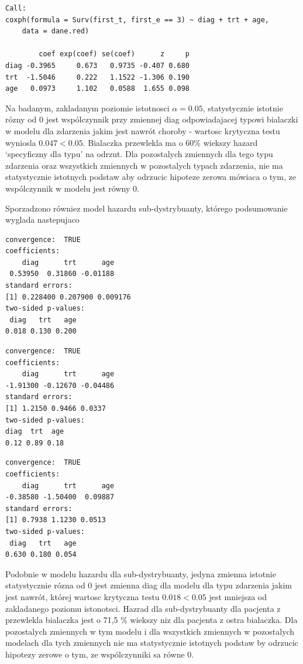 \documentclass[]{article}
\begin{document}
\begin{verbatim}
Call:
coxph(formula = Surv(first_t, first_e == 3) ~ diag + trt + age, 
    data = dane.red)

        coef exp(coef) se(coef)      z     p
diag -0.3965     0.673   0.9735 -0.407 0.680
trt  -1.5046     0.222   1.1522 -1.306 0.190
age   0.0973     1.102   0.0588  1.655 0.098
\end{verbatim}

Na badanym, zakladanym poziomie istotnosci \(\alpha=0.05\),
statystycznie istotnie rózny od 0 jest wspólczynnik przy zmiennej
\textsf{diag} odpowiadajacej typowi bialaczki w modelu dla zdarzenia
jakim jest nawrót choroby - wartosc krytyczna testu wyniosla
\(0.047<0.05\). Bialaczka przewlekla ma o 60\% wiekszy hazard
`specyficzny dla typu' na odrzut. Dla pozostalych zmiennych dla tego
typu zdarzenia oraz wszystkich zmiennych w pozostalych typach zdarzenia,
nie ma statystycznie istotnych podstaw aby odrzucic hipoteze zerowa
mówiaca o tym, ze wspólczynnik w modelu jest równy 0.

Sporzadzono równiez model hazardu sub-dystrybuanty, którego podsumowanie
wyglada nastepujaco

\begin{verbatim}
convergence:  TRUE 
coefficients:
    diag      trt      age 
 0.53950  0.31860 -0.01188 
standard errors:
[1] 0.228400 0.207900 0.009176
two-sided p-values:
 diag   trt   age 
0.018 0.130 0.200 
\end{verbatim}

\begin{verbatim}
convergence:  TRUE 
coefficients:
    diag      trt      age 
-1.91300 -0.12670 -0.04486 
standard errors:
[1] 1.2150 0.9466 0.0337
two-sided p-values:
diag  trt  age 
0.12 0.89 0.18 
\end{verbatim}

\begin{verbatim}
convergence:  TRUE 
coefficients:
    diag      trt      age 
-0.38580 -1.50400  0.09887 
standard errors:
[1] 0.7938 1.1230 0.0513
two-sided p-values:
 diag   trt   age 
0.630 0.180 0.054 
\end{verbatim}

Podobnie w modelu hazardu dla sub-dystrybuanty, jedyna zmienna istotnie
statystycznie rózna od 0 jest zmienna \textsf{diag} dla modelu dla typu
zdarzenia jakim jest nawrót, której wartosc krytyczna testu
\(0.018<0.05\) jest mniejsza od zakladanego poziomu istonotsci. Hazrad
dla sub-dystrybuanty dla pacjenta z przewlekla bialaczka jest o 71,5 \%
wiekszy niz dla pacjenta z ostra bialaczka. Dla pozostalych zmiennych w
tym modelu i dla wszystkich zmiennych w pozostalych modelach dla tych
zmiennych nie ma statystycznie istotnych podstaw by odrzucic hipotezy
zerowe o tym, ze wspólczynniki sa równe 0.
\end{document}
